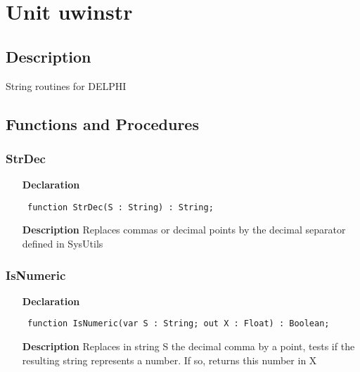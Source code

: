 \documentclass[12pt,a4paper,oneside]{report}
\newcommand{\declarationitem}[1]{\textbf{#1}}
\newcommand{\descriptiontitle}[1]{\textbf{#1}}
\newcommand{\code}[1]{\texttt{#1}}
\begin{document}
\section{Unit uwinstr}
\label{uwinstr}
\subsection{Description}
String routines for DELPHI 
\subsection{Functions and Procedures}
\subsubsection{StrDec}
\label{uwinstr-StrDec}
\begin{itemize}\item[\declarationitem{Declaration}\hfill]
	\begin{flushleft}
		\code{
			function StrDec(S : String) : String;}
		
	\end{flushleft}
	
	\par
	\item[\descriptiontitle{Description}]
	Replaces commas or decimal points by the decimal separator defined in SysUtils
	
\end{itemize}
\subsubsection{IsNumeric}
\label{uwinstr-IsNumeric}
\begin{itemize}\item[\declarationitem{Declaration}\hfill]
	\begin{flushleft}
		\code{
			function IsNumeric(var S : String; out X : Float) : Boolean;}
		
	\end{flushleft}
	
	\par
	\item[\descriptiontitle{Description}]
	Replaces in string S the decimal comma by a point, tests if the resulting string represents a number. If so, returns this number in X
	
\end{itemize}
\end{document}
